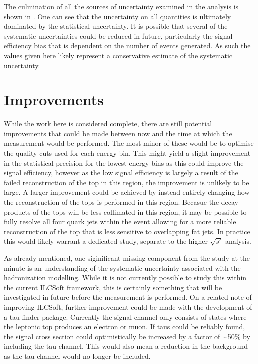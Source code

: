 The culmination of all the sources of uncertainty examined in the analysis is shown in . One can see that the uncertainty on all quantities is ultimately dominated by the statistical uncertainty. It is possible that several of the systematic uncertainties could be reduced in future, particularly the signal efficiency bias that is dependent on the number of events generated. As such the values given here likely represent a conservative estimate of the systematic uncertainty.


\section{Improvements}

While the work here is considered complete, there are still potential improvements that could be made between now and the time at which the measurement would be performed. The most minor of these would be to optimise the quality cuts used for each energy bin. This might yield a slight improvement in the statistical precision for the lowest energy bins as this could improve the signal efficiency, however as the low signal efficiency is largely a result of the failed reconstruction of the top in this region, the improvement is unlikely to be large. A larger improvement could be achieved by instead entirely changing how the reconstruction of the tops is performed in this region. Becasue the decay products of the tops will be less collimated in this region, it may be possible to fully resolve all four quark jets within the event allowing for a more reliable reconstruction of the top that is less sensitive to overlapping fat jets. In practice this would likely warrant a dedicated study, separate to the higher $\sqrt{s'}$ analysis.

As already mentioned, one siginificant missing component from the study at the minute is an understanding of the systematic uncertainty associated with the hadronization modelling. While it is not currently possible to study this within the current ILCSoft framework, this is certainly something that will be investigated in future before the measurement is performed. On a related note of improving ILCSoft, further improvement could be made with the development of a tau finder package. Currently the signal channel only consists of states where the leptonic top produces an electron or muon. If taus could be reliably found, the signal cross section could optimistically be increased by a factor of $\sim$50\% by including the tau channel. This would also mean a reduction in the background as the tau channel would no longer be included. 

